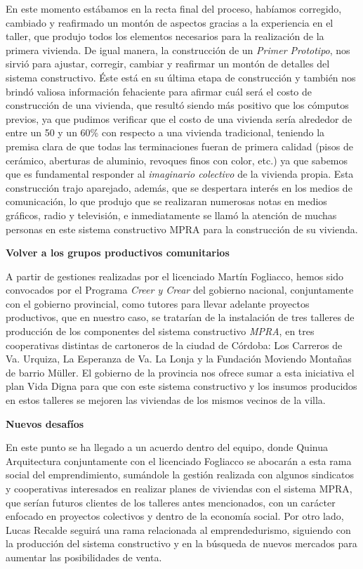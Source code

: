 \begin{fullwidth}
En este momento estábamos en la recta final del proceso, habíamos
corregido, cambiado y reafirmado un montón de aspectos gracias a la
experiencia en el taller, que produjo todos los elementos necesarios
para la realización de la primera vivienda. De igual manera, la
construcción de un \emph{Primer Prototipo}, nos sirvió para ajustar,
corregir, cambiar y reafirmar un montón de detalles del sistema
constructivo. Éste está en su última etapa de construcción y también nos
brindó valiosa información fehaciente para afirmar cuál será el costo de
construcción de una vivienda, que resultó siendo más positivo que los
cómputos previos, ya que pudimos verificar que el costo de una vivienda
sería alrededor de entre un 50 y un 60\% con respecto a una vivienda
tradicional, teniendo la premisa clara de que todas las terminaciones
fueran de primera calidad (pisos de cerámico, aberturas de aluminio,
revoques finos con color, etc.) ya que sabemos que es fundamental
responder al \emph{imaginario colectivo} de la vivienda propia. Esta
construcción trajo aparejado, además, que se despertara interés en los
medios de comunicación, lo que produjo que se realizaran numerosas notas
en medios gráficos, radio y televisión, e inmediatamente se llamó la
atención de muchas personas en este sistema constructivo MPRA para la
construcción de su vivienda.

\textbf{Volver a los grupos productivos comunitarios}

A partir de gestiones realizadas por el licenciado Martín Fogliacco,
hemos sido convocados por el Programa \emph{Creer y Crear} del gobierno
nacional, conjuntamente con el gobierno provincial, como tutores para
llevar adelante proyectos productivos, que en nuestro caso, se tratarían
de la instalación de tres talleres de producción de los componentes del
sistema constructivo \emph{MPRA}, en tres cooperativas distintas de
cartoneros de la ciudad de Córdoba: Los Carreros de Va. Urquiza, La
Esperanza de Va. La Lonja y la Fundación Moviendo Montañas de barrio
Müller. El gobierno de la provincia nos ofrece sumar a esta iniciativa
el plan Vida Digna para que con este sistema constructivo y los insumos
producidos en estos talleres se mejoren las viviendas de los mismos
vecinos de la villa.

\textbf{Nuevos desafíos}

En este punto se ha llegado a un acuerdo dentro del equipo, donde Quinua
Arquitectura conjuntamente con el licenciado Fogliacco se abocarán a
esta rama social del emprendimiento, sumándole la gestión realizada con
algunos sindicatos y cooperativas interesados en realizar planes de
viviendas con el sistema MPRA, que serían futuros clientes de los
talleres antes mencionados, con un carácter enfocado en proyectos
colectivos y dentro de la economía social. Por otro lado, Lucas Recalde
seguirá una rama relacionada al emprendedurismo, siguiendo con la
producción del sistema constructivo y en la búsqueda de nuevos mercados
para aumentar las posibilidades de venta.


\end{fullwidth}
